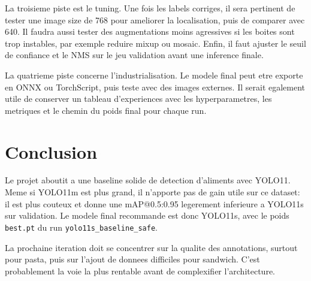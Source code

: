 \documentclass[11pt,a4paper]{article}
\begin{document}
La troisieme piste est le tuning. Une fois les labels corriges, il sera pertinent
de tester une image size de 768 pour ameliorer la localisation, puis de comparer
avec 640. Il faudra aussi tester des augmentations moins agressives si les boites
sont trop instables, par exemple reduire mixup ou mosaic. Enfin, il faut ajuster le
seuil de confiance et le NMS sur le jeu validation avant une inference finale.

La quatrieme piste concerne l'industrialisation. Le modele final peut etre exporte
en ONNX ou TorchScript, puis teste avec des images externes. Il serait egalement
utile de conserver un tableau d'experiences avec les hyperparametres, les metriques
et le chemin du poids final pour chaque run.

\section{Conclusion}
Le projet aboutit a une baseline solide de detection d'aliments avec YOLO11. Meme
si YOLO11m est plus grand, il n'apporte pas de gain utile sur ce dataset: il est
plus couteux et donne une mAP@0.5:0.95 legerement inferieure a YOLO11s sur
validation. Le modele final recommande est donc YOLO11s, avec le poids
\texttt{best.pt} du run \texttt{yolo11s\_baseline\_safe}.

La prochaine iteration doit se concentrer sur la qualite des annotations, surtout
pour pasta, puis sur l'ajout de donnees difficiles pour sandwich. C'est probablement
la voie la plus rentable avant de complexifier l'architecture.



\end{document}
